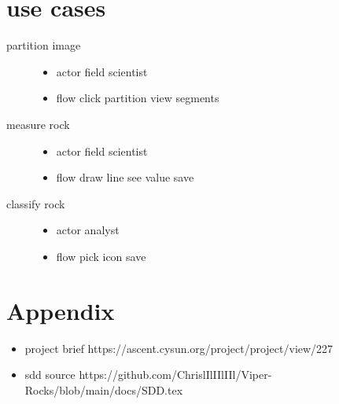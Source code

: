 \documentclass{article}
\begin{document}
\section{use cases}
\begin{description}
\item[partition image]
\begin{itemize}
\item actor field scientist
\item flow click partition view segments
\end{itemize}
\item[measure rock]
\begin{itemize}
\item actor field scientist
\item flow draw line see value save
\end{itemize}
\item[classify rock]
\begin{itemize}
\item actor analyst
\item flow pick icon save
\end{itemize}
\end{description}

\section{Appendix}
\begin{itemize}
\item project brief https://ascent.cysun.org/project/project/view/227
\item sdd source https://github.com/ChrislIlIIlIIl/Viper-Rocks/blob/main/docs/SDD.tex
\end{itemize}
\end{document}
